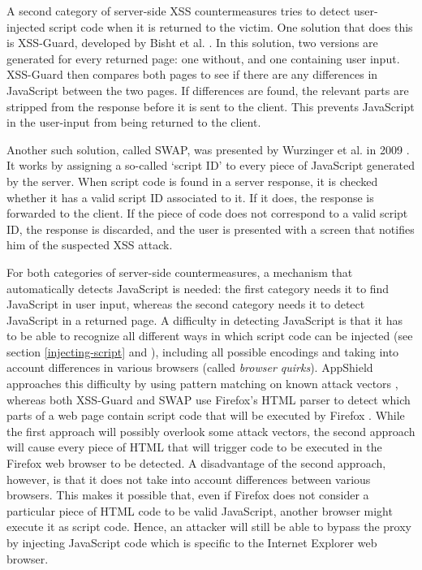 A second category of server-side XSS countermeasures tries to detect user-injected script code when it is returned to the victim. One solution that does this is XSS-Guard, developed by Bisht et al. \cite{Bisht2008}. In this solution, two versions are generated for every returned page: one without, and one containing user input. XSS-Guard then compares both pages to see if there are any differences in JavaScript between the two pages. If differences are found, the relevant parts are stripped from the response before it is sent to the client. This prevents JavaScript in the user-input from being returned to the client.

Another such solution, called SWAP, was presented by Wurzinger et al. in 2009 \cite{Wurzinger2009}. It works by assigning a so-called `script ID' to every piece of JavaScript generated by the server. When script code is found in a server response, it is checked whether it has a valid script ID associated to it. If it does, the response is forwarded to the client. If the piece of code does not correspond to a valid script ID, the response is discarded, and the user is presented with a screen that notifies him of the suspected XSS attack.

For both categories of server-side countermeasures, a mechanism that automatically detects JavaScript is needed: the first category needs it to find JavaScript in user input, whereas the second category needs it to detect JavaScript in a returned page. A difficulty in detecting JavaScript is that it has to be able to recognize all different ways in which script code can be injected (see section \ref{injecting-script} and \cite{Jim2007}), including all possible encodings and taking into account differences in various browsers (called \emph{browser quirks}). AppShield approaches this difficulty by using pattern matching on known attack vectors \cite{Klein2002}, whereas both XSS-Guard and SWAP use Firefox's HTML parser to detect which parts of a web page contain script code that will be executed by Firefox \cite{Bisht2008,Wurzinger2009}. While the first approach will possibly overlook some attack vectors, the second approach will cause every piece of HTML that will trigger code to be executed in the Firefox web browser to be detected. A disadvantage of the second approach, however, is that it does not take into account differences between various browsers. This makes it possible that, even if Firefox does not consider a particular piece of HTML code to be valid JavaScript, another browser might execute it as script code. Hence, an attacker will still be able to bypass the proxy by injecting JavaScript code which is specific to the Internet Explorer web browser.

